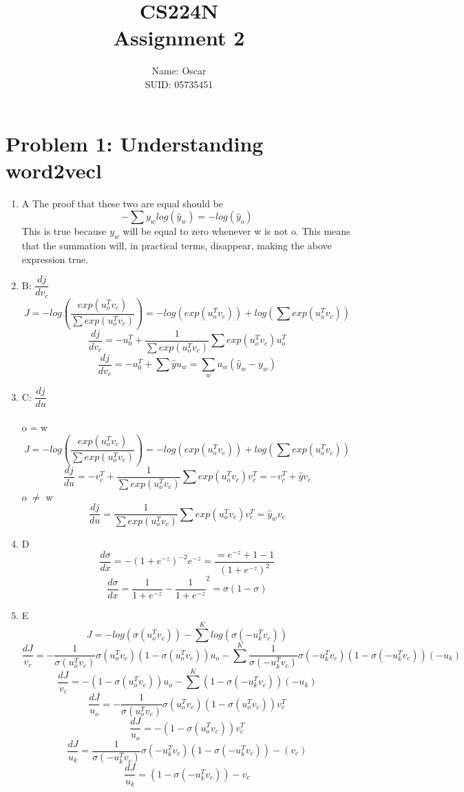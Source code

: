 \documentclass{article}
\title{CS224N \\ Assignment 2}
\author{Name: Oscar      \\ SUID: 05735451}
\date{}
\begin{document}
\maketitle
\pagestyle{fancy} 

\section*{Problem 1: Understanding word2vecl}
\begin{enumerate}[label=(\roman*)]
\item{ A}
	The proof that these two are equal should be 
\[
	- {\sum}y_wlog(\hat{y}_w) = -log(\hat{y}_o)
\]
This is true because $y_w$ will be equal to zero whenever w is not o. This means that the summation will, in practical terms, disappear, making the above expression true.  

\item {B: $\dfrac{dj}{dv_c}$}
\[
J = -log(\dfrac{exp(u_o^Tv_c)}{{\sum}exp(u_o^Tv_c)})  = -log(exp(u_o^Tv_c)) + log({\sum}exp(u_o^Tv_c))
\]
\[
\dfrac{dj}{dv_c} = -u_0^T + \dfrac{1}{{\sum}exp(u_o^Tv_c)}{\sum}exp(u_o^Tv_c)u_o^T
\]
\[
\dfrac{dj}{dv_c} = -u_0^T + {\sum}\hat{y}u_w =\sum_wu_w(\hat{y}_w - y_w)
\]

\item {C: $\dfrac{dj}{du}$}\\
\\
o = w
\[
	J = -log(\dfrac{exp(u_o^Tv_c)}{{\sum}exp(u_o^Tv_c)})  = -log(exp(u_o^Tv_c)) + log({\sum}exp(u_o^Tv_c))
\]
\[
	\dfrac{dj}{du} = -v_c^T + \dfrac{1}{{\sum}exp(u_o^Tv_c)}{\sum}exp(u_o^Tv_c)v_c^T = -v_c^T + \hat{y}v_c
\]
o $\neq$ w
\[
	\dfrac{dj}{du} = \dfrac{1}{{\sum}exp(u_o^Tv_c)}{\sum}exp(u_o^Tv_c)v_c^T =  \hat{y}_wv_c
\]

\item{D}
\[
	\dfrac{d\sigma}{dx} = -(1 + e^{-z})^{-2}e^{-z} = \dfrac{=e^{-z}+1-1}{(1 + e^{-z})^{2}}
\]
\[
	\dfrac{d\sigma}{dx} = \dfrac{1}{1 + e^{-z}} - \dfrac{1}{1+e^{-z}}^2 = \sigma(1-\sigma)
\]

\item{E}
\[
	J = -log(\sigma(u_o^Tv_c)) - \sum^Klog(\sigma(-u_k^Tv_c))
\]
\[
	\dfrac{dJ}{v_c} = -\dfrac{1}{\sigma(u_o^Tv_c)}\sigma(u_o^Tv_c)(1- \sigma(u_o^Tv_c))u_o - \sum^K\dfrac{1}{\sigma(-u_k^Tv_c)}\sigma(-u_k^Tv_c)(1- \sigma(-u_k^Tv_c))(-u_k)
\]
\[
	\dfrac{dJ}{v_c} = -(1- \sigma(u_o^Tv_c))u_o - \sum^K(1- \sigma(-u_k^Tv_c))(-u_k)
\]
\[
	\dfrac{dJ}{u_o} = -\dfrac{1}{\sigma(u_o^Tv_c)}\sigma(u_o^Tv_c)(1- \sigma(u_o^Tv_c))v_c^T
\]
\[
	\dfrac{dJ}{u_o} = -(1- \sigma(u_o^Tv_c))v_c^T
\]
\[
	\dfrac{dJ}{u_k} = \dfrac{1}{\sigma(-u_k^Tv_c)}\sigma(-u_k^Tv_c)(1- \sigma(-u_k^Tv_c))-(v_c)
\]
\[
	\dfrac{dJ}{u_k} = (1- \sigma(-u_k^Tv_c))-v_c
\]


\end{enumerate}
\end{document}
